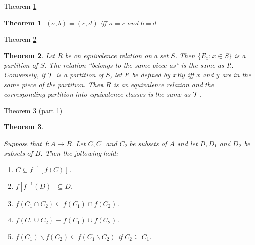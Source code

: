 \documentclass[avery5371,grid]{flashcards}
\newtheorem{theorem}{Theorem}
\begin{document}
\begin{flashcard}[Theorem]{Theorem \ref{thm08}}
\begin{theorem}
\label{thm08}
$(a,b) = (c,d)$ iff $a=c$ and $b=d$.
\end{theorem}
\end{flashcard}

\begin{flashcard}[Theorem]{Theorem \ref{thm09}}
\begin{theorem}
\label{thm09}
Let $R$ be an equivalence relation on a set $S$.  Then $\{ E_x : x \in S\}$ is a partition of $S$.  The relation ``belongs to the same piece as'' is the same as $R$.  Conversely, if $\cal{T}$ is a partition of $S$, let $R$ be defined by $xRy$ iff $x$ and $y$ are in the same piece of the partition.  Then $R$ is an equivalence relation and the corresponding partition into equivalence classes is the same as $\cal{T}$.
\end{theorem}
\end{flashcard}

\begin{flashcard}[Theorem]{Theorem \ref{thm10} (part 1)}
\begin{theorem}
\label{thm10}
\begin{small}
Suppose that $f: A \to B$.  Let $C, C_1$ and $C_2$ be subsets of $A$ and
let $D, D_1$ and $D_2$ be subsets of $B$.  Then the following hold:
\begin{enumerate}
\item $C \subseteq f^{-1}[f(C)]$.
\item $f[f^{-1}(D)] \subseteq D$.
\item $f(C_1 \cap C_2 ) \subseteq f(C_1) \cap f(C_2)$.
\item $f(C_1 \cup C_2) = f(C_1) \cup f(C_2)$.
\item $f(C_1) \smallsetminus f(C_2) \subseteq f(C_1 \smallsetminus C_2)$
if $C_2 \subseteq C_1$.
\end{enumerate}
\end{small}
\end{theorem}
\end{flashcard}
\end{document}
